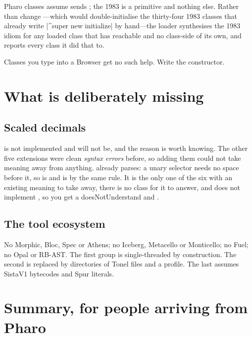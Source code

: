 Pharo classes assume  sends ; the 1983
 is a primitive and nothing else. Rather than change
---which would double-initialise the thirty-four 1983
classes that already write \ct|^super new initialize| by hand---the loader
synthesises the 1983 idiom for any loaded class that has 
reachable and no class-side  of its own, and reports every class it
did that to.

Classes you type into a Browser get no such help. Write the constructor.

\section{What is deliberately missing}

\subsection{Scaled decimals}

 is not implemented and will not be, and the reason is worth
knowing. The other five extensions were clean \emph{syntax errors} before, so
adding them could not take meaning away from anything.  already
parses: a unary selector needs no space before it, so  is
 and  is  by the same rule. It is the
only one of the six with an existing meaning to take away, there is no
 class for it to answer, and  does not implement
, so you get a doesNotUnderstand and .

\subsection{The tool ecosystem}

No Morphic, Bloc, Spec or Athens; no Iceberg, Metacello or Monticello; no
Fuel; no Opal or RB-AST. The first group is single-threaded by construction.
The second is replaced by directories of Tonel files and a profile. The last
assumes SistaV1 bytecodes and Spur literals.

\section{Summary, for people arriving from Pharo}

